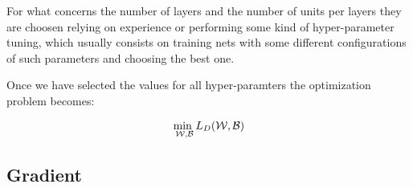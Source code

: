 For what concerns the number of layers and the number of units per layers they are choosen relying on experience or performing some kind of hyper-parameter tuning, which usually consists on training nets
with some different configurations of such parameters and choosing the best one.

Once we have selected the values for all hyper-paramters the optimization problem becomes:

\begin{equation}
\underset{\mathcal{W},\mathcal{B}}{\text{min  }} L_D(\mathcal{W},\mathcal{B}) \\
\end{equation}


\subsection{Gradient}


